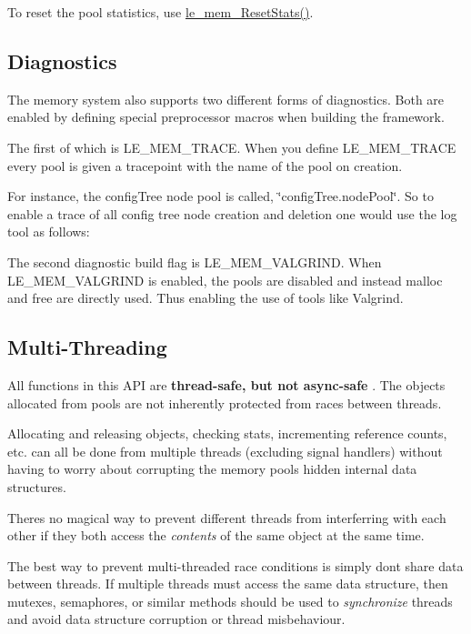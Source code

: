 To reset the pool statistics, use {\ttfamily \hyperlink{le__mem_8h_a35b7e757356764c39f0a7ede2aa242ae}{le\+\_\+mem\+\_\+\+Reset\+Stats()}}.\hypertarget{c_memory_mem_diagnostics}{}\subsection{Diagnostics}\label{c_memory_mem_diagnostics}
The memory system also supports two different forms of diagnostics. Both are enabled by defining special preprocessor macros when building the framework.

The first of which is {\ttfamily L\+E\+\_\+\+M\+E\+M\+\_\+\+T\+R\+A\+C\+E}. When you define {\ttfamily L\+E\+\_\+\+M\+E\+M\+\_\+\+T\+R\+A\+C\+E} every pool is given a tracepoint with the name of the pool on creation.

For instance, the config\+Tree node pool is called, \char`\"{}config\+Tree.\+node\+Pool\char`\"{}. So to enable a trace of all config tree node creation and deletion one would use the log tool as follows\+:




The second diagnostic build flag is {\ttfamily L\+E\+\_\+\+M\+E\+M\+\_\+\+V\+A\+L\+G\+R\+I\+N\+D}. When {\ttfamily L\+E\+\_\+\+M\+E\+M\+\_\+\+V\+A\+L\+G\+R\+I\+N\+D} is enabled, the pools are disabled and instead malloc and free are directly used. Thus enabling the use of tools like Valgrind.\hypertarget{c_memory_mem_threading}{}\subsection{Multi-\/\+Threading}\label{c_memory_mem_threading}
All functions in this A\+P\+I are {\bfseries  thread-\/safe, but not async-\/safe }. The objects allocated from pools are not inherently protected from races between threads.

Allocating and releasing objects, checking stats, incrementing reference counts, etc. can all be done from multiple threads (excluding signal handlers) without having to worry about corrupting the memory pools\textquotesingle{} hidden internal data structures.

There\textquotesingle{}s no magical way to prevent different threads from interferring with each other if they both access the {\itshape contents} of the same object at the same time.

The best way to prevent multi-\/threaded race conditions is simply don\textquotesingle{}t share data between threads. If multiple threads must access the same data structure, then mutexes, semaphores, or similar methods should be used to {\itshape synchronize} threads and avoid data structure corruption or thread misbehaviour.

